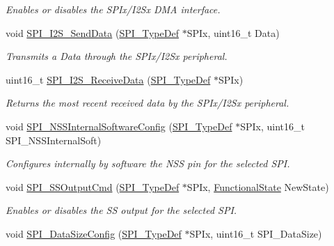 \begin{DoxyCompactItemize}
\begin{DoxyCompactList}\small\item\em Enables or disables the S\+P\+Ix/\+I2\+Sx D\+MA interface. \end{DoxyCompactList}\item 
void \hyperlink{group___s_p_i___exported___functions_gad5af40bebe8dbe3fa8bd476489d7e3da}{S\+P\+I\+\_\+\+I2\+S\+\_\+\+Send\+Data} (\hyperlink{struct_s_p_i___type_def}{S\+P\+I\+\_\+\+Type\+Def} $\ast$S\+P\+Ix, uint16\+\_\+t Data)
\begin{DoxyCompactList}\small\item\em Transmits a Data through the S\+P\+Ix/\+I2\+Sx peripheral. \end{DoxyCompactList}\item 
uint16\+\_\+t \hyperlink{group___s_p_i___exported___functions_gab77de76547f3bff403236b263b070a30}{S\+P\+I\+\_\+\+I2\+S\+\_\+\+Receive\+Data} (\hyperlink{struct_s_p_i___type_def}{S\+P\+I\+\_\+\+Type\+Def} $\ast$S\+P\+Ix)
\begin{DoxyCompactList}\small\item\em Returns the most recent received data by the S\+P\+Ix/\+I2\+Sx peripheral. \end{DoxyCompactList}\item 
void \hyperlink{group___s_p_i___exported___functions_ga56fc508a482f032f9eb80e4c63184126}{S\+P\+I\+\_\+\+N\+S\+S\+Internal\+Software\+Config} (\hyperlink{struct_s_p_i___type_def}{S\+P\+I\+\_\+\+Type\+Def} $\ast$S\+P\+Ix, uint16\+\_\+t S\+P\+I\+\_\+\+N\+S\+S\+Internal\+Soft)
\begin{DoxyCompactList}\small\item\em Configures internally by software the N\+SS pin for the selected S\+PI. \end{DoxyCompactList}\item 
void \hyperlink{group___s_p_i___exported___functions_ga4ec54abdedf6cd17403d853a926d91c1}{S\+P\+I\+\_\+\+S\+S\+Output\+Cmd} (\hyperlink{struct_s_p_i___type_def}{S\+P\+I\+\_\+\+Type\+Def} $\ast$S\+P\+Ix, \hyperlink{group___exported__types_gac9a7e9a35d2513ec15c3b537aaa4fba1}{Functional\+State} New\+State)
\begin{DoxyCompactList}\small\item\em Enables or disables the SS output for the selected S\+PI. \end{DoxyCompactList}\item 
void \hyperlink{group___s_p_i___exported___functions_gafc82e90841d7879535d655c035709cb1}{S\+P\+I\+\_\+\+Data\+Size\+Config} (\hyperlink{struct_s_p_i___type_def}{S\+P\+I\+\_\+\+Type\+Def} $\ast$S\+P\+Ix, uint16\+\_\+t S\+P\+I\+\_\+\+Data\+Size)

\end{DoxyCompactItemize}
